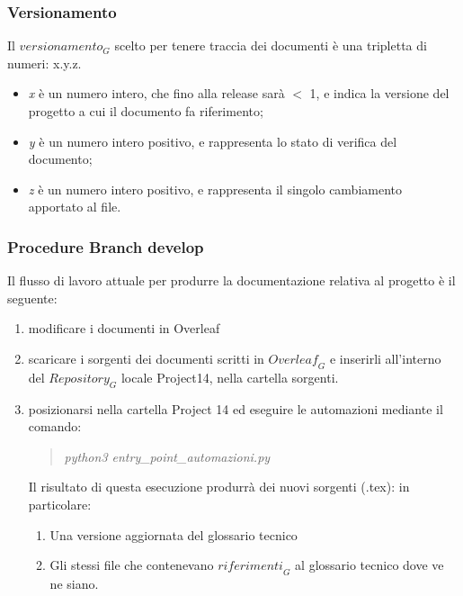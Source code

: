 \subsubsection{Versionamento}

Il $\textit{versionamento}_G$ scelto per tenere traccia dei documenti è una tripletta di numeri: x.y.z.

\begin{itemize}
    \item \textit{x} è un numero intero, che fino alla release sarà $<$ 1, e indica la versione del progetto a cui il documento fa riferimento;
    \item \textit{y} è un numero intero positivo, e rappresenta lo stato di verifica del documento;
    \item \textit{z} è un numero intero positivo, e rappresenta il singolo cambiamento apportato al file.
\end{itemize}


\subsubsection{Procedure Branch develop }

Il flusso di lavoro attuale per produrre la documentazione relativa al progetto è il seguente:
\begin{enumerate}
    \item modificare i documenti in Overleaf
    \item scaricare i sorgenti dei documenti scritti in $\textit{Overleaf}_G$ e inserirli all'interno del $\textit{Repository}_G$ locale Project14, nella cartella sorgenti.
    \item posizionarsi nella cartella Project 14 ed eseguire le automazioni mediante il comando:
        \begin{quote}
            \emph{  python3 entry\_point\_automazioni.py} 
        \end{quote}
    Il risultato di questa esecuzione produrrà dei nuovi sorgenti (.tex): in particolare:
    \begin{enumerate}
        \item Una versione aggiornata del glossario tecnico
        \item Gli stessi file che contenevano $\textit{riferimenti}_G$ al glossario tecnico dove ve ne siano.
    \end{enumerate}
\end{enumerate}

